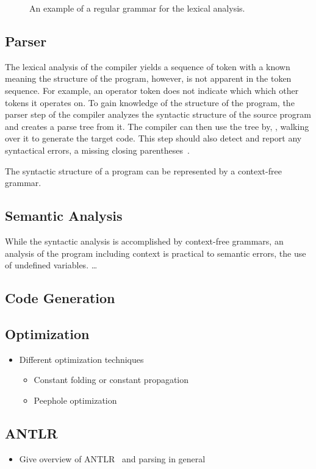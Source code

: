 \begin{figure}[htp]
    \centering
    
    \caption{An example of a regular grammar for the lexical analysis.}
    \label{fig:example_lexer}
\end{figure}

\subsection{Parser}
The lexical analysis of the compiler yields a sequence of token with a known meaning the structure of the program, however, is not apparent in the token sequence. For example, an operator token does not indicate which which other tokens it operates on. To gain knowledge of the structure of the program, the parser step of the compiler analyzes the syntactic structure of the source program and creates a parse tree from it. 
The compiler can then use the tree by, \eg, walking over it to generate the target code. This step should also detect and report any syntactical errors, \eg a missing closing parentheses~\cite{VSSD07}.

The syntactic structure of a program can be represented by a context-free grammar.

\subsection{Semantic Analysis}
While the syntactic analysis is accomplished by context-free grammars, an analysis of the program including context is practical to semantic errors, \eg the use of undefined variables. \dots

\subsection{Code Generation}

\subsection{Optimization}
\label{sec:background_compiler_codeOptimization}
\begin{itemize}
    \item Different optimization techniques
    \begin{itemize}
        \item Constant folding or constant propagation
        \item Peephole optimization
    \end{itemize}
\end{itemize}

\subsection{ANTLR}
\begin{itemize}
    \item Give overview of ANTLR~\cite{PaQu95} and parsing in general
\end{itemize}